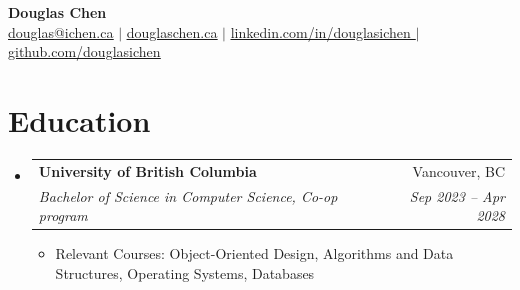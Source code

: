 \documentclass[letterpaper,11pt]{article}
\makeatletter
\newcommand{\resumeItem}[1]{
  \item\small{
    {#1 \vspace{-0.6pt}}
  }
}
\newcommand{\resumeSubheading}[4]{
  \vspace{0pt}\item
    \begin{tabular*}{0.97\textwidth}[t]{l@{\extracolsep{\fill}}r}
      \textbf{#1} & #2 \\
      \textit{\small#3} & \textit{\small #4} \\
    \end{tabular*}\vspace{-7pt}
}
\newcommand{\resumeSubHeadingListStart}{\begin{itemize}[leftmargin=0.15in, label={}]}
\newcommand{\resumeSubHeadingListEnd}{\end{itemize}}
\newcommand{\resumeItemListStart}{\begin{itemize}}
\newcommand{\resumeItemListEnd}{\end{itemize}\vspace{-7pt}}
\makeatother
\begin{document}

\begin{center}
    \textbf{\Huge Douglas Chen} \\ \vspace{1pt}
    \href{mailto:douglas@ichen.ca}{\underline{douglas@ichen.ca}} $|$ 
    \href{https://www.douglaschen.ca/}{\underline{douglaschen.ca}} $|$
    \href{https://www.linkedin.com/in/douglasichen/}{\underline{linkedin.com/in/douglasichen
}} $|$
    \href{https://www.github.com/douglasichen}{\underline{github.com/douglasichen}}
\end{center}




\section{Education}
  \resumeSubHeadingListStart
    \resumeSubheading
      {University of British Columbia}{Vancouver, BC}
      {Bachelor of Science in Computer Science, Co-op program}{Sep 2023 -- Apr 2028}
      \resumeItemListStart 
        \resumeItem{Relevant Courses: Object-Oriented Design, Algorithms and Data Structures, Operating Systems, Databases}
    \resumeItemListEnd
  \resumeSubHeadingListEnd
\end{document}
